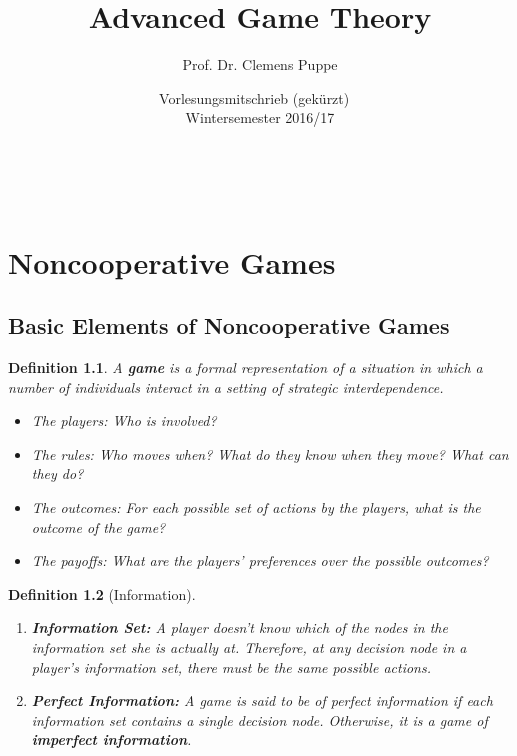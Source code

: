 \documentclass[12pt]{extreport} %
\title{Advanced Game Theory}
\author{Prof. Dr. Clemens Puppe}
\date{Vorlesungsmitschrieb (gekürzt) ~\vspace{0.2cm} \\ Wintersemester 2016/17}
\makeatletter
\theoremstyle{named}
\theoremstyle{itshape}
\newtheorem*{definition}{Definition}
\theoremstyle{normal}
\def\maketitle{ \begin{titlepage} 
			~\vspace{3cm} 
		\begin{center} {\Huge \@title} \end{center} 
	 		\vspace*{1cm} 
	 	\begin{center} {\large \@author} \end{center} 
	 	\begin{center} \@date \end{center} 
	 		\vspace*{7cm} 
	 	\begin{center} \@publishers \end{center} 
	 		\vfill 
	\end{titlepage} }
\makeatother
\begin{document}
\begin{titlepage}
	\maketitle
	\thispagestyle{empty}
\end{titlepage}
	
\tableofcontents
\thispagestyle{empty} 
  
\chapter{Noncooperative Games}

\section{Basic Elements of Noncooperative Games}


\begin{definition}
	A \textbf{game} is a formal representation of a situation in which a number of individuals interact in a setting of strategic interdependence.
	
	\begin{itemize}
		\item The players: Who is involved?
		\item The rules: Who moves when? What do they know when they move? What can they do?
		\item The outcomes: For each possible set of actions by the players, what is the outcome of the game?
		\item The payoffs: What are the players' preferences over the possible outcomes?
	\end{itemize} 
\end{definition}

\begin{definition}[Information] ~\
	\begin{enumerate}
		\item \textbf{Information Set:} A player doesn't know which of the nodes in the information set she is actually at. Therefore, at any decision node in a player's information set, there must be the same possible actions.
		\item \textbf{Perfect Information:} A game is said to be of perfect information if each information set contains a single decision node. Otherwise, it is a game of \textbf{imperfect information}.
	\end{enumerate}
\end{definition} 
\end{document}
